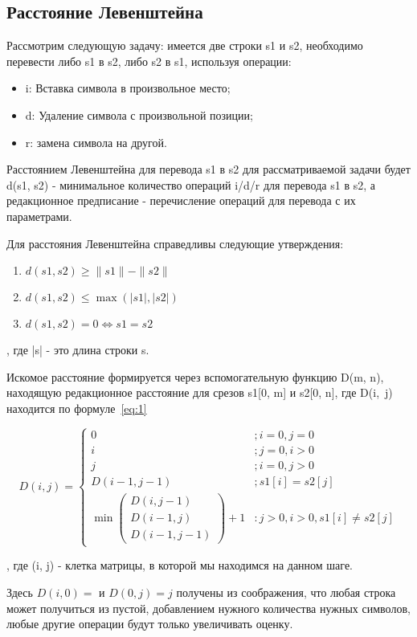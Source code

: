 \subsection{Расстояние Левенштейна}
Рассмотрим следующую задачу: имеется две строки s1 и s2, необходимо перевести либо s1 в s2, либо s2 в s1, используя операции:

\begin{itemize}
	\item i: Вставка символа в произвольное место;
	\item d: Удаление символа с произвольной позиции;
	\item r: замена символа на другой.
\end{itemize}
Расстоянием Левенштейна для перевода s1 в s2 для рассматриваемой задачи будет d(s1, s2) - минимальное количество операций i/d/r для перевода s1 в s2, а редакционное предписание - перечисление операций для перевода с их параметрами.

Для расстояния Левенштейна справедливы следующие утверждения:
\begin{enumerate}
	\item $d(s1, s2) \geq \|s1\| - \|s2\|$
	\item $d(s1, s2) \leq \max(|s1|, |s2|)$
	\item $d(s1, s2) = 0 \iff s1 = s2$
\end{enumerate},
где |s| - это длина строки s.

Искомое расстояние формируется через вспомогательную функцию D(m, n), находящую редакционное расстояние для срезов s1[0, m] и s2[0, n], где D(i,~j) находится по формуле~\ref{eq:1}


\[
D(i, j) = \begin{cases}
0 & ; i = 0, j = 0 \\
i & ; j = 0, i > 0 \\
j & ; i = 0, j > 0 \\
D(i - 1, j - 1) & ; s1[i] = s2[j] \\
\min\begin{pmatrix}
D(i, j - 1) \\
D(i - 1, j)\\
D(i - 1, j - 1)
\end{pmatrix} + 1 & : j > 0, i > 0, s1[i] \neq s2[j]
\end{cases} \label{eq:1} \tag{1}
\]

, где (i, j) - клетка матрицы, в которой мы находимся на данном шаге.~\cite{redRasst}

Здесь $ D(i, 0) =  $ и $ D(0, j) = j $ получены из соображения, что любая строка может получиться из пустой, добавлением нужного количества нужных символов, любые другие операции будут только увеличивать оценку.

